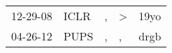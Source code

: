 \begin{supertabular}{lllll}
 12-29-08 &  ICLR &  , &  \textgreater &  19yo \\
 04-26-12 &  PUPS &  , &             , &  drgb \\
\end{supertabular}

